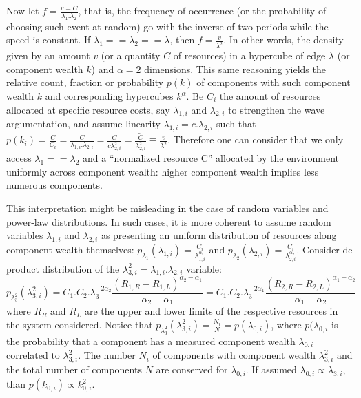 \documentclass[a4paper, 11pt]{article} %
\begin{document}
Now let $f=\frac{v=C}{\lambda_1 . \lambda_2}$, that is,
the frequency of occurrence
(or the probability of choosing such event at random) go with the inverse of two periods while the speed is constant. 
If $\lambda_1==\lambda_2==\lambda$, then $f=\frac{v}{\lambda^2}$.
In other words, the density given by an amount $v$
(or a quantity $C$ of resources) in a hypercube of
edge $\lambda$ (or component wealth $k$)
and $\alpha=2$ dimensions.
This same reasoning yields the relative count,
fraction or probability $p(k)$
of components with such component wealth $k$ and corresponding hypercubes $k^\alpha$.
Be $C_i$ the amount of resources allocated at
specific resource costs,
say $\lambda_{1,i}$ and $\lambda_{2,i}$ to strengthen the wave argumentation,
and assume linearity $\lambda_{1,i}=c.\lambda_{2,i}$
such that
$p(k_i)=\frac{C}{C_i}=\frac{C}{\lambda_{1,i}.\lambda_{2,i}}=
\frac{C}{c\lambda_{2,i}^2}=\frac{\widetilde{C}}{\lambda_{2,i}^2}\equiv\frac{v}{\lambda^2}$.
Therefore one can consider that we only access $\lambda_1==\lambda_2$ and a ``normalized resource C'' allocated by the environment uniformly across component wealth:
higher component wealth implies less numerous components. 

This interpretation might be misleading in the case of random variables
and power-law distributions.
In such cases, it is more coherent to assume random variables
$\lambda_{1,i}$ and $\lambda_{2,i}$ as presenting an uniform distribution of resources along component wealth
themselves:
$p_{\lambda_{1}}(\lambda_{1,i})=\frac{C_i}{\lambda_{1,i}^{\alpha_1}}$
and
$p_{\lambda_{2}}(\lambda_{2,i})=\frac{C_i}{\lambda_{2,i}^{\alpha_2}}$.
Consider de product distribution of the
$\lambda_{3,i}^2=\lambda_{1,i}.\lambda_{2,i}$
variable:
\begin{equation}
p_{\lambda_3^2}(\lambda_{3,i}^2)=C_1.C_2.\lambda_3^{-2\alpha_2}\frac{(R_{1,R}-R_{1,L})^{\alpha_2-\alpha_1}}{\alpha_2-\alpha_1}
=C_1.C_2.\lambda_3^{-2\alpha_1}\frac{(R_{2,R}-R_{2,L})^{\alpha_1-\alpha_2}}{\alpha_1-\alpha_2}
\end{equation}
where $R_R$ and $R_L$ are the upper and lower limits of the respective resources in the system considered.
Notice that $p_{\lambda_3^2}(\lambda_{3,i}^2)=\frac{N_i}{N}=p(\lambda_{0,i})$,
where $p(\lambda_{0,i}$ is the probability that a component has a measured
component wealth $\lambda_{0,i}$ correlated to $\lambda_{3,i}^2$. 
The number $N_i$ of components with component wealth $\lambda_{3,i}^2$ and the total
number of components $N$ are conserved for $\lambda_{0,i}$.
If assumed $\lambda_{0,i} \propto \lambda_{3,i}$, than
$p(k_{0,i}) \propto k_{0,i}^2$.
\end{document}
